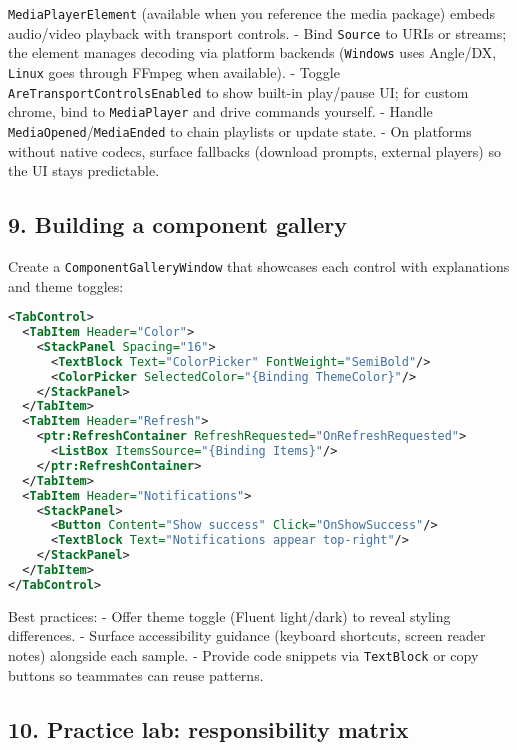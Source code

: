 \passthrough{\lstinline!MediaPlayerElement!} (available when you
reference the media package) embeds audio/video playback with transport
controls. - Bind \passthrough{\lstinline!Source!} to URIs or streams;
the element manages decoding via platform backends
(\passthrough{\lstinline!Windows!} uses Angle/DX,
\passthrough{\lstinline!Linux!} goes through FFmpeg when available). -
Toggle \passthrough{\lstinline!AreTransportControlsEnabled!} to show
built-in play/pause UI; for custom chrome, bind to
\passthrough{\lstinline!MediaPlayer!} and drive commands yourself. -
Handle
\passthrough{\lstinline!MediaOpened!}/\passthrough{\lstinline!MediaEnded!}
to chain playlists or update state. - On platforms without native
codecs, surface fallbacks (download prompts, external players) so the UI
stays predictable.

\subsection{9. Building a component
gallery}\label{building-a-component-gallery}

Create a \passthrough{\lstinline!ComponentGalleryWindow!} that showcases
each control with explanations and theme toggles:

\begin{lstlisting}[language=XML]
<TabControl>
  <TabItem Header="Color">
    <StackPanel Spacing="16">
      <TextBlock Text="ColorPicker" FontWeight="SemiBold"/>
      <ColorPicker SelectedColor="{Binding ThemeColor}"/>
    </StackPanel>
  </TabItem>
  <TabItem Header="Refresh">
    <ptr:RefreshContainer RefreshRequested="OnRefreshRequested">
      <ListBox ItemsSource="{Binding Items}"/>
    </ptr:RefreshContainer>
  </TabItem>
  <TabItem Header="Notifications">
    <StackPanel>
      <Button Content="Show success" Click="OnShowSuccess"/>
      <TextBlock Text="Notifications appear top-right"/>
    </StackPanel>
  </TabItem>
</TabControl>
\end{lstlisting}

Best practices: - Offer theme toggle (Fluent light/dark) to reveal
styling differences. - Surface accessibility guidance (keyboard
shortcuts, screen reader notes) alongside each sample. - Provide code
snippets via \passthrough{\lstinline!TextBlock!} or copy buttons so
teammates can reuse patterns.

\subsection{10. Practice lab: responsibility
matrix}\label{practice-lab-responsibility-matrix}

